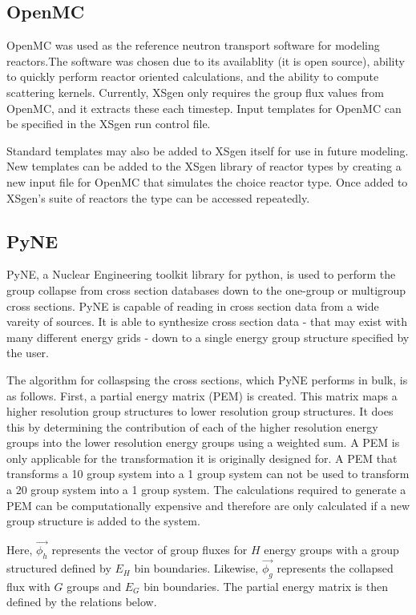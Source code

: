 \documentclass{article}
\begin{document}
\subsection{OpenMC}
OpenMC was used as the reference neutron transport software for modeling reactors.The software was chosen due to its availablity (it is open source), ability to quickly perform
reactor oriented calculations\citeme [journalclubarticle], and the ability to compute scattering kernels. Currently, XSgen only requires the group flux values from OpenMC, and it extracts these each timestep. Input templates for OpenMC can be specified in the XSgen run control file. 

Standard templates may also be added to XSgen itself for use in future modeling. New templates can be added to the XSgen library of reactor types by creating a new input file for OpenMC that simulates the choice reactor type. Once added to XSgen's suite of reactors the type can be accessed repeatedly. 

\subsection{PyNE}
PyNE, a Nuclear Engineering toolkit library for python, is used to perform the group collapse
from cross section databases down to the one-group or multigroup cross sections.
PyNE is capable of reading in cross section data from a wide
vareity of sources. It is able to synthesize cross section data - that may exist with
many different energy grids - down to a single energy group structure specified by the user.

The algorithm for collaspsing the cross sections, which PyNE performs in bulk, is as follows.
First, a partial energy matrix (PEM) is created. This matrix maps a higher resolution group
structures to lower resolution group structures. It does this by determining the contribution
of each of the higher resolution energy groups into the lower resolution energy groups using
a weighted sum. A PEM is only applicable for the transformation it is originally designed for. A PEM that transforms a 10 group system into a 1 group system can not be used to transform a 20 group system into a 1 group system. The calculations required to generate a PEM can be computationally expensive and therefore are only calculated if a new group structure is added to the system.  

Here, $\vec{\phi_h}$ represents the vector of group fluxes for $H$ energy groups with
a group structured defined by $E_H$ bin boundaries. Likewise, $\vec{\phi_g}$ represents
the collapsed flux with $G$ groups and $E_G$ bin boundaries. The partial energy
matrix is then defined by the relations below.
\end{document}
